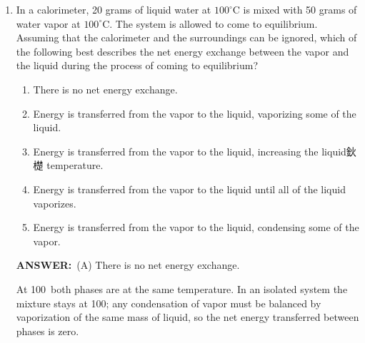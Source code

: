 ﻿\documentclass[12pt, a4paper]{article}
\makeatletter
\newcommand{\finalanswer}[1]{\textbf{ANSWER:}~#1}
\newif\if@categoryprinted
\newcommand{\category}[1]{\if@categoryprinted\relax\else\textit{\textcolor{gray}{Category: #1}}\global\@categoryprintedtrue\fi}
\makeatother
\begin{document}
\begin{CJK*}{UTF8}{gbsn}
\begin{enumerate}[itemsep=1.0em, topsep=0.6em]
\category{Simple Machines \& Statics}
\begin{answerbox}
\finalanswer{(D) 4}
\end{answerbox}
\begin{insightbox}
Ideal mechanical advantage equals the number of load-supporting rope segments: 4.
\end{insightbox}
\begin{solutionbox}

The ideal mechanical advantage equals the number of rope segments supporting the load. Here the movable block is supported by 4 segments, so $\text{IMA}=4$.
\\
\emph{Reminder:} massless, frictionless rope $\Rightarrow$ equal tension in all supporting segments.
\end{solutionbox}

\item \label{prob:6}
In a calorimeter, 20 grams of liquid water at $100^\circ$C is mixed with 50 grams of water vapor at $100^\circ$C. The system is allowed to come to equilibrium. Assuming that the calorimeter and the surroundings can be ignored, which of the following best describes the net energy exchange between the vapor and the liquid during the process of coming to equilibrium?
\begin{enumerate}[label=(\Alph*)]
    \item There is no net energy exchange.
    \item Energy is transferred from the vapor to the liquid, vaporizing some of the liquid.
    \item Energy is transferred from the vapor to the liquid, increasing the liquid鈥檚 temperature.
    \item Energy is transferred from the vapor to the liquid until all of the liquid vaporizes.
    \item Energy is transferred from the vapor to the liquid, condensing some of the vapor.
\end{enumerate}

\category{Thermodynamics \& Phase Equilibrium}
\begin{answerbox}
\finalanswer{(A) There is no net energy exchange.}
\end{answerbox}
\begin{insightbox}
At 100\textcelsius\ both phases are at the same temperature. In an isolated system the mixture stays at 100\textcelsius; any condensation of vapor must be balanced by vaporization of the same mass of liquid, so the net energy transferred between phases is zero.
\end{insightbox}
\begin{solutionbox}


\end{solutionbox}
\end{enumerate}
\end{CJK*}
\end{document}
